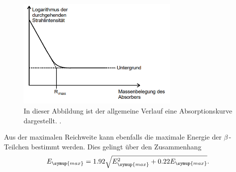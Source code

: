 \begin{figure}
    \centering
    \includegraphics[width = 0.7\textwidth]{content/Absorptionskurve.PNG}
    \caption{In dieser Abbildung ist der allgemeine Verlauf eine Absorptionskurve dargestellt. \cite{v704}.}
    \label{fig:Absorptionskurve}
\end{figure}

Aus der maximalen Reichweite kann ebenfalls die maximale Energie der $\beta$\,-Teilchen bestimmt werden. Dies gelingt über den Zusammenhang 
\begin{equation}
    E_{\symup{max}} = 1.92\sqrt{E_{\symup{max}}^2 + 0.22E_{\symup{max}}}.
\end{equation}